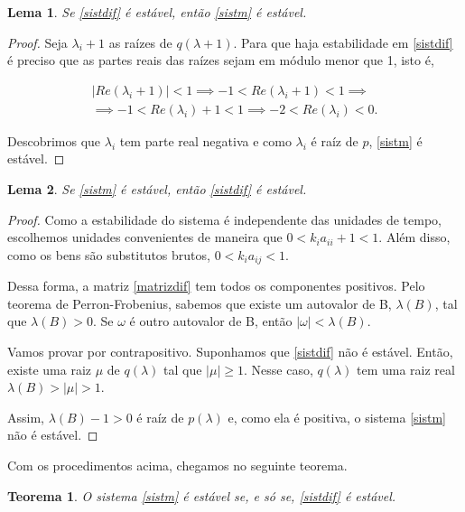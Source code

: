 \documentclass[
	12pt,				%
	openright,			%
	twoside,			%
	a4paper,			%
	english,			%
	french,				%
	spanish,			%
	brazil				%
	]{abntex2}
\newtheorem{teorema}{Teorema}[chapter]
\newtheorem{lema}{Lema}[chapter]
\begin{document}
\begin{lema}
	Se \ref{sistdif} é estável, então \ref{sistm} é estável.
\end{lema}

\begin{proof}
	Seja $\lambda_i + 1$ as raízes de $q(\lambda + 1)$. Para que haja estabilidade em
	\ref{sistdif} é preciso que as partes reais das raízes sejam em módulo menor que 1,
	isto é,

	\begin{equation}
		\begin{aligned}
		|Re(\lambda_i + 1)| < 1 \implies -1 < Re(\lambda_i + 1) < 1 \implies \\
		\implies -1 < Re(\lambda_i) + 1 < 1 \implies -2 < Re(\lambda_i) < 0.
	\end{aligned}
	\end{equation}

		Descobrimos que $\lambda_i$ tem parte real negativa e como $\lambda_i$ é raíz de $p$,
		\ref{sistm} é estável.
\end{proof}

\begin{lema}
	Se \ref{sistm} é estável, então \ref{sistdif} é estável.
\end{lema}

\begin{proof}
Como a estabilidade do sistema é independente das unidades de tempo, escolhemos
unidades convenientes de maneira que $0 < k_ia_{ii} + 1 < 1$. Além disso, como
os bens são substitutos brutos, $0 < k_ia_{ij} < 1$.

Dessa forma, a matriz \ref{matrizdif} tem todos os componentes positivos. Pelo teorema de Perron-Frobenius,
sabemos que existe um autovalor de B, $\lambda(B)$, tal que $\lambda(B) > 0$.
Se $\omega$ é outro autovalor de B, então $|\omega| < \lambda(B)$.

Vamos provar por contrapositivo. Suponhamos que \ref{sistdif} não é estável. Então, existe uma raiz $\mu$ de
$q(\lambda)$ tal que $|\mu| \geq 1$. Nesse caso, $q(\lambda)$ tem uma raiz real $\lambda(B) > |\mu| > 1$.

Assim, $\lambda(B) - 1 > 0$ é raíz de $p(\lambda)$ e, como ela é positiva,
o sistema \ref{sistm} não é estável.
\end{proof}

Com os procedimentos acima, chegamos no seguinte teorema.

\begin{teorema}
	O sistema \ref{sistm} é estável se, e só se, \ref{sistdif} é estável.
\end{teorema}
\end{document}
